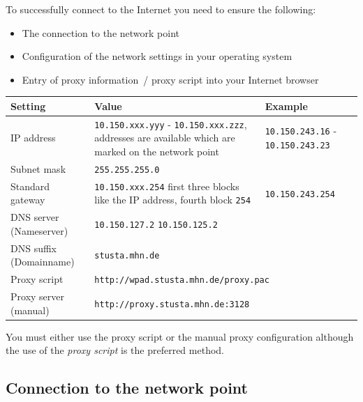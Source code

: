 \documentclass[a4paper,12pt]{scrartcl}
\begin{document}
To successfully connect to the Internet you need to ensure the following:
\begin{itemize}
    \item The connection to the network point
    \item Configuration of the network settings in your operating system
    \item Entry of proxy information~/ proxy script into your Internet browser
\end{itemize}


\begin{center}
  \begin{tabularx}{\linewidth}{|lXp{.2\linewidth}|}
    \hline
    Setting & Value & Example \\
    \hline \hline
    IP address & \nolinkurl{10.150.xxx.yyy} - \nolinkurl{10.150.xxx.zzz}, \newline 8 addresses are available which are marked on the network point & \nolinkurl{10.150.243.16} - \nolinkurl{10.150.243.23} \\
    \hline
    Subnet mask & \nolinkurl{255.255.255.0} & \\
    \hline
    Standard gateway & \nolinkurl{10.150.xxx.254} \newline first three blocks like the IP address, fourth block \nolinkurl{254} & \nolinkurl{10.150.243.254} \\
    \hline
    DNS server (Nameserver) & \nolinkurl{10.150.127.2} \newline \nolinkurl{10.150.125.2} & \\
    \hline
    DNS suffix (Domainname) & \nolinkurl{stusta.mhn.de} & \\
    \hline
    Proxy script & \multicolumn{2}{l|}{\nolinkurl{http://wpad.stusta.mhn.de/proxy.pac}} \\
    \hline
    Proxy server (manual) & \multicolumn{2}{l|}{\nolinkurl{http://proxy.stusta.mhn.de:3128}} \\
    \hline
  \end{tabularx}
\end{center}

You must either use the proxy script or the manual proxy configuration although the use of the \emph{proxy script} is the preferred method.

\subsection*{Connection to the network point}
\end{document}
